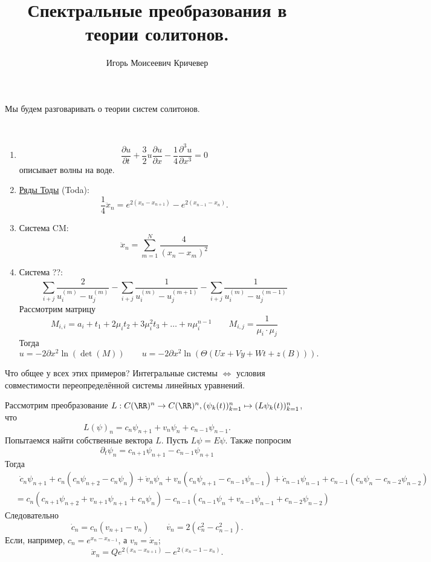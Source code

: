 \documentclass[12pt,a4paper]{article}
\title{Спектральные преобразования в теории солитонов.}
\author{Игорь Моисеевич Кричевер}
\begin{document}
    \maketitle

    Мы будем разговаривать о теории систем солитонов.

    \begin{example}\ 
        \begin{enumerate}
            \item \[\frac{\partial u}{\partial t} + \frac{3}{2} u \frac{\partial u}{\partial x} - \frac{1}{4} \frac{\partial^3 u}{\partial x^3} = 0\]
                описывает волны на воде.
            \item \href{https://ru.wikipedia.org/wiki/Цепочка_Тоды}{Ряды Тоды} (Toda): \[\frac{1}{4} \ddot{x}_n = e^{2(x_n - x_{n+1})} - e^{2(x_{n-1} - x_n)}.\]
            \item Система CM: \[\ddot{x}_n = \sum_{m=1}^N \frac{4}{(x_n - x_m)^2}\]
            \item Система ??: \[\sum_{i+j} \frac{2}{u_i^{(m)} - u_j^{(m)}} - \sum_{i+j} \frac{1}{u_i^{(m)} - u_j^{(m+1)}} - \sum_{i+j} \frac{1}{u_i^{(m)} - u_j^{(m-1)}}\]
                Рассмотрим матрицу
                \[
                    M_{i, i} = a_i + t_1 + 2 \mu_i t_2 + 3 \mu_i^2 t_3 + \dots + n \mu_i^{n-1}
                    \qquad
                    M_{i, j} = \frac{1}{\mu_i \cdot \mu_j}
                \]
                Тогда
                \[
                    u = -2 \partial x^2 \ln(\det(M))
                    \qquad
                    u = -2 \partial x^2 \ln(\Theta(Ux + Vy + Wt + z(B))).
                \]
        \end{enumerate}
    \end{example}

    Что общее у всех этих примеров? Интегральные системы $\Leftrightarrow$ условия совместимости переопределённой системы линейных уравнений.

    \begin{example}
        Рассмотрим преобразование $L: C(\RR)^n \to C(\RR)^n, (\psi_k(t))_{k=1}^n \mapsto (L \psi_k(t))_{k=1}^n$, что
        \[L(\psi)_n = c_n \psi_{n+1} + v_n \psi_n + c_{n-1} \psi_{n-1}.\]
        Попытаемся найти собственные вектора $L$. Пусть $L\psi = E \psi$. Также попросим
        \[\partial_t \psi_n = c_{n+1} \psi_{n+1} - c_{n-1} \psi_{n+1}\]
        Тогда
        \begin{align*}
            &\mathop{\phantom{=}} \dot{c}_n \psi_{n+1} + c_n (c_n \psi_{n+2} - c_n \psi_n) + \dot{v}_n \psi_n + v_n (c_n \psi_{n+1} - c_{n-1} \psi_{n-1}) + \dot{c}_{n-1} \psi_{n-1} + c_{n-1} (c_n \psi_n - c_{n-2} \psi_{n-2})\\
            &= c_n(c_{n+1} \psi_{n+2} + v_{n+1} \psi_{n+1} + c_n \psi_n) - c_{n-1} (c_{n-1} \psi_n + v_{n-1} \psi_{n-1} + c_{n-2} \psi_{n-2})
        \end{align*}
        Следовательно
        \[
            \dot{c}_n = c_n (v_{n+1} - v_n)
            \qquad
            \dot{v_n} = 2 (c_n^2 - c_{n-1}^2).
        \]
        Если, например, $c_n = e^{x_n - x_{n-1}}$, а $v_n = \dot{x}_n$;
        \[\ddot{x}_n = Q e^{2(x_n - x_{n+1})} - e^{2(x_n-1 - x_n)}.\]
    \end{example}
\end{document}
